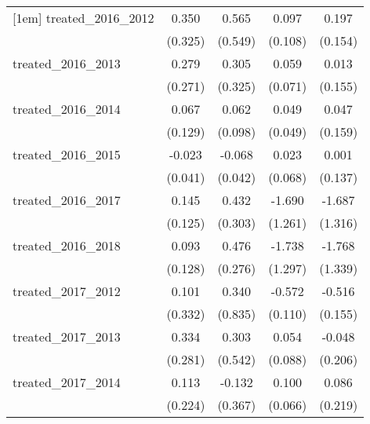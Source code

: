 {\begin{tabular}{l*{4}{c}}
[1em]
treated\_2016\_2012&       0.350         &       0.565         &       0.097         &       0.197         \\
            &     (0.325)         &     (0.549)         &     (0.108)         &     (0.154)         \\
[1em]
treated\_2016\_2013&       0.279         &       0.305         &       0.059         &       0.013         \\
            &     (0.271)         &     (0.325)         &     (0.071)         &     (0.155)         \\
[1em]
treated\_2016\_2014&       0.067         &       0.062         &       0.049         &       0.047         \\
            &     (0.129)         &     (0.098)         &     (0.049)         &     (0.159)         \\
[1em]
treated\_2016\_2015&      -0.023         &      -0.068         &       0.023         &       0.001         \\
            &     (0.041)         &     (0.042)         &     (0.068)         &     (0.137)         \\
[1em]
treated\_2016\_2017&       0.145         &       0.432         &      -1.690         &      -1.687         \\
            &     (0.125)         &     (0.303)         &     (1.261)         &     (1.316)         \\
[1em]
treated\_2016\_2018&       0.093         &       0.476         &      -1.738         &      -1.768         \\
            &     (0.128)         &     (0.276)         &     (1.297)         &     (1.339)         \\
[1em]
treated\_2017\_2012&       0.101         &       0.340         &      -0.572\sym{***}&      -0.516\sym{***}\\
            &     (0.332)         &     (0.835)         &     (0.110)         &     (0.155)         \\
[1em]
treated\_2017\_2013&       0.334         &       0.303         &       0.054         &      -0.048         \\
            &     (0.281)         &     (0.542)         &     (0.088)         &     (0.206)         \\
[1em]
treated\_2017\_2014&       0.113         &      -0.132         &       0.100         &       0.086         \\
            &     (0.224)         &     (0.367)         &     (0.066)         &     (0.219)         \\

\end{tabular}}
